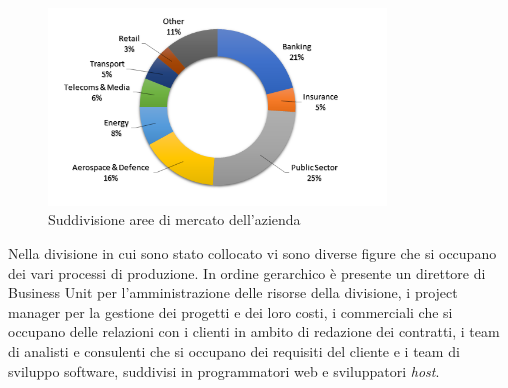 	\begin{figure}[H]
	\centering
	   	\includegraphics[width=0.8\textwidth]{immagini/Mercati_Principali}
	   	\caption{Suddivisione aree di mercato dell'azienda}
	\end{figure}
	
	Nella divisione in cui sono stato collocato vi sono diverse figure che si occupano dei vari processi di produzione. In ordine gerarchico è presente un direttore di Business Unit per l'amministrazione delle risorse della divisione, i project manager per la gestione dei progetti e dei loro costi, i commerciali che si occupano delle relazioni con i clienti in ambito di redazione dei contratti, i team di analisti e consulenti che si occupano dei requisiti del cliente e i team di sviluppo software, suddivisi in programmatori web e sviluppatori \textit{host}.\\
	
	
	

